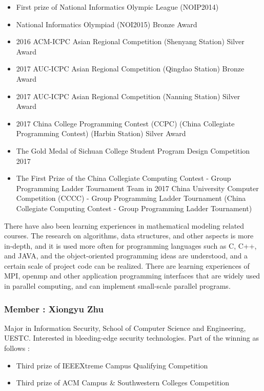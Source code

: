 \documentclass{mcmthesis}
\begin{document}
\begin{itemize}
	\item First prize of National Informatics Olympic League (NOIP2014)
	\item National Informatics Olympiad (NOI2015) Bronze Award
	\item 2016 ACM-ICPC Asian Regional Competition (Shenyang Station) Silver Award
	\item 2017 AUC-ICPC Asian Regional Competition (Qingdao Station) Bronze Award
	\item 2017 AUC-ICPC Asian Regional Competition (Nanning Station) Silver Award
	\item 2017 China College Programming Contest (CCPC) (China Collegiate Programming Contest) (Harbin Station) Silver Award
	\item The Gold Medal of Sichuan College Student Program Design Competition 2017
	\item The First Prize of the China Collegiate Computing Contest - Group Programming Ladder Tournament Team in 2017 China University Computer Competition (CCCC) - Group Programming Ladder Tournament (China Collegiate Computing Contest - Group Programming Ladder Tournament)
\end{itemize}

\par There have also been learning experiences in mathematical modeling related courses. The research on algorithms, data structures, and other aspects is more in-depth, and it is used more often for programming languages ​​such as C, C++, and JAVA, and the object-oriented programming ideas are understood, and a certain scale of project code can be realized. There are learning experiences of MPI, openmp and other application programming interfaces that are widely used in parallel computing, and can implement small-scale parallel programs.



\subsubsection*{\textbf{Member} : Xiongyu Zhu}

\par Major in Information Security, School of Computer Science and Engineering, UESTC. Interested in bleeding-edge security technologies. Part of the winning as follows :

\begin{itemize}
	\item Third prize of IEEEXtreme Campus Qualifying Competition
	\item Third prize of ACM Campus \& Southwestern Colleges Competition
\end{itemize}
\end{document}
